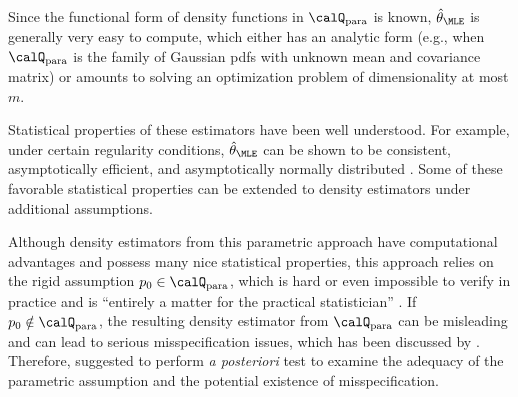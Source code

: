 \documentclass[12pt]{article}
\theoremstyle{definition}
\theoremstyle{theorem}
\theoremstyle{remark}
\begin{document}
Since the functional form of density functions in $\calQ_{\mathrm{para}}$ is known, $\hat{\theta}_{\MLE}$ is generally very easy to compute, which either has an analytic form (e.g., when $\calQ_{\mathrm{para}}$ is the family of Gaussian pdfs with unknown mean and covariance matrix) or amounts to solving an optimization problem of dimensionality at most $m$. 

Statistical properties of these estimators have been well understood. For example, under certain regularity conditions, $\hat{\theta}_{\MLE}$ can be shown to be consistent, asymptotically efficient, and asymptotically normally distributed \parencite{Casella2002-vu}. 
Some of these favorable statistical properties can be extended to density estimators under additional assumptions. 

Although density estimators from this parametric approach have computational advantages and possess many nice statistical properties, this approach relies on the rigid assumption $p_0 \in \calQ_{\mathrm{para}}$, which is hard or even impossible to verify in practice and is ``entirely a matter for the practical statistician'' \parencite{Fisher1922-qi}. If $p_0 \notin \calQ_{\mathrm{para}}$, the resulting density estimator from $\calQ_{\mathrm{para}}$ can be misleading and can lead to serious misspecification issues, which has been discussed by \textcites{Huber1967-sd, White1982-dn}. Therefore, \textcite{Fisher1922-qi} suggested to perform \textit{a posteriori} test to examine the adequacy of the parametric assumption and the potential existence of misspecification. 
\end{document}
